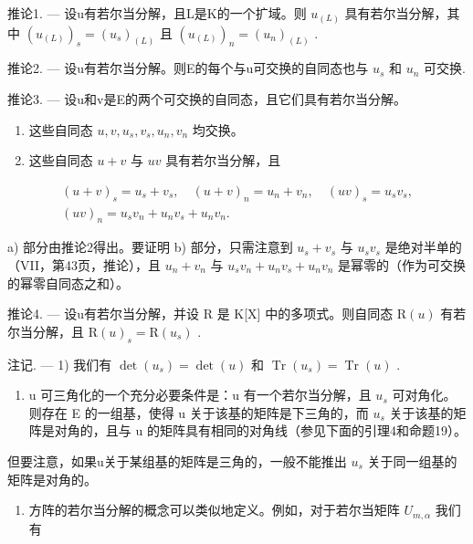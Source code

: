 推论1. --- 设u有若尔当分解，且L是K的一个扩域。则 \(u_{(L)}\) 具有若尔当分解，其中 \((u_{(L)})_{s} = (u_{s})_{(L)}\) 且 \((u_{(L)})_{n} = (u_{n})_{(L)}\) .

推论2. --- 设u有若尔当分解。则E的每个与u可交换的自同态也与 \(u_{s}\) 和 \(u_{n}\) 可交换.

推论3. --- 设u和v是E的两个可交换的自同态，且它们具有若尔当分解。

\begin{enumerate}
\def\labelenumi{\alph{enumi})}
\item
  这些自同态 \(u, v, u_s, v_s, u_n, v_n\) 均交换。
\item
  这些自同态 \(u + v\) 与 \(uv\) 具有若尔当分解，且
\end{enumerate}

\[
\begin{array}{c} (u + v) _ {s} = u _ {s} + v _ {s}, \quad (u + v) _ {n} = u _ {n} + v _ {n}, \quad (u v) _ {s} = u _ {s} v _ {s}, \\ (u v) _ {n} = u _ {s} v _ {n} + u _ {n} v _ {s} + u _ {n} v _ {n}. \end{array}
\]

a) 部分由推论2得出。要证明 b) 部分，只需注意到 \(u_{s} + v_{s}\) 与 \(u_{s}v_{s}\) 是绝对半单的（VII，第43页，推论），且 \(u_{n} + v_{n}\) 与 \(u_{s}v_{n} + u_{n}v_{s} + u_{n}v_{n}\) 是幂零的（作为可交换的幂零自同态之和）。

推论4. --- 设u有若尔当分解，并设 R 是 K{[}X{]} 中的多项式。则自同态 \(\mathrm{R}(u)\) 有若尔当分解，且 \(\mathrm{R}(u)_{s} = \mathrm{R}(u_{s})\) .

注记. --- 1) 我们有 \(\det(u_s) = \det(u)\) 和 \(\operatorname{Tr}(u_s) = \operatorname{Tr}(u)\) .

\begin{enumerate}
\def\labelenumi{\arabic{enumi})}
\setcounter{enumi}{1}
\tightlist
\item
  u 可三角化的一个充分必要条件是：u 有一个若尔当分解，且 \(u_{s}\) 可对角化。则存在 E 的一组基，使得 u 关于该基的矩阵是下三角的，而 \(u_{s}\) 关于该基的矩阵是对角的，且与 u 的矩阵具有相同的对角线（参见下面的引理4和命题19）。
\end{enumerate}

但要注意，如果u关于某组基的矩阵是三角的，一般不能推出 \(u_{s}\) 关于同一组基的矩阵是对角的。

\begin{enumerate}
\def\labelenumi{\arabic{enumi})}
\setcounter{enumi}{2}
\tightlist
\item
  方阵的若尔当分解的概念可以类似地定义。例如，对于若尔当矩阵 \(U_{m,\alpha}\) 我们有
\end{enumerate}

